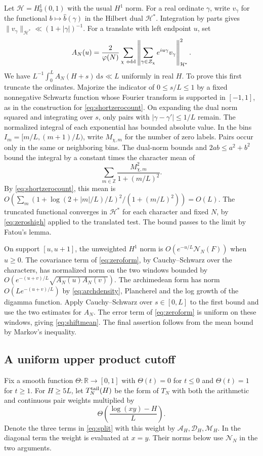 \documentclass[11pt,a4paper]{article}
\numberwithin{equation}{section}
\newcommand{\ud}{\mathrm d}
\newcommand{\NN}{\mathcal N_N}
\begin{document}
Let $\mathcal H=H^1_0(0,1)$ with the usual $H^1$ norm.
For a real ordinate $\gamma$, write $v_\gamma$ for the
functional $b\mapsto\widehat b(\gamma)$ in the Hilbert dual
$\mathcal H^*$. Integration by parts gives
$\|v_\gamma\|_{\mathcal H^*}\ll(1+|\gamma|)^{-1}$.
For a translate with left endpoint $u$, set
\[
 A_N(u)=\frac{2}{\varphi(N)}
   \sum_{\chi\ {\rm odd}}
     \left\|\sum_{\gamma\in\mathcal Z_\chi}
                    e^{iu\gamma}v_\gamma\right\|_{\mathcal H^*}^2 .
\]
We have $L^{-1}\int_0^L A_N(H+s)\,\ud s\ll L$ uniformly
in real $H$. To prove this first truncate the ordinates.
Majorize the indicator of $0\le s/L\le1$ by a fixed
nonnegative Schwartz function whose Fourier transform is
supported in $[-1,1]$, as in the construction for
\cref{eq:shortzerocount}. On expanding the dual norm squared
and integrating over $s$, only pairs with
$|\gamma-\gamma'|\le1/L$ remain. The normalized integral
of each exponential has bounded absolute value.
In the bins $I_m=[m/L,(m+1)/L)$, write $M_{\chi,m}$ for
the number of zero labels. Pairs occur only in the same
or neighboring bins. The dual-norm bounds and
$2ab\le a^2+b^2$ bound the integral by a constant times
the character mean of
\[
 \sum_{m\in\mathbb Z}\frac{M_{\chi,m}^2}{1+(m/L)^2}.
\]
By \cref{eq:shortzerocount}, this mean is
$O(\sum_m(1+\log(2+|m|/L)/L)^2/(1+(m/L)^2))=O(L)$.
The truncated functional converges in $\mathcal H^*$ for
each character and fixed $N$, by \cref{eq:zeroshigh}
applied to the translated test. The bound passes to the
limit by Fatou's lemma.

On support $[u,u+1]$, the unweighted $H^1$ norm is
$O(e^{-u/L}\NN(F))$ when $u\ge0$. The covariance term of
\cref{eq:zeroform}, by Cauchy--Schwarz over the characters,
has normalized norm on the two windows bounded by
$O(e^{-(u+v)/L}\sqrt{A_N(u)A_N(v)})$.
The archimedean form has norm $O(L e^{-(u+v)/L})$ by
\cref{eq:archdensity}, Plancherel and the log growth of
the digamma function. Apply Cauchy--Schwarz over
$s\in[0,L]$ to the first bound and use the two estimates
for $A_N$. The error term of \cref{eq:zeroform} is uniform
on these windows, giving \cref{eq:shiftmean}. The final
assertion follows from the mean bound by Markov's inequality.

\subsection{A uniform upper product cutoff}

Fix a smooth function $\Theta\colon\mathbb R\to[0,1]$ with
$\Theta(t)=0$ for $t\le0$ and $\Theta(t)=1$ for $t\ge1$.
For $H\ge5L$, let $T_N^{\rm tail}(H)$ be the form of $T_N$
with both the arithmetic and continuous pair weights multiplied by
\begin{equation}
 \Theta\!\left(\frac{\log(xy)-H}{L}\right).
 \label{eq:uppertailmask}
\end{equation}
Denote the three terms in \cref{eq:split} with this weight by
$\mathcal A_H,\mathcal D_H,\mathcal M_H$. In the diagonal term
the weight is evaluated at $x=y$. Their norms below use $\NN$
in the two arguments.
\end{document}
